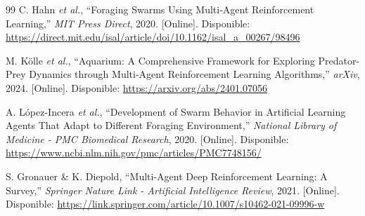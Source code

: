 \documentclass[conference]{IEEEtran}
\begin{document}
\begin{thebibliography}{99}
C. Hahn \textit{et al.}, ``Foraging Swarms Using Multi-Agent Reinforcement Learning,'' \textit{MIT Press Direct}, 2020. [Online]. Disponible: \url{https://direct.mit.edu/isal/article/doi/10.1162/isal_a_00267/98496}

M. Kölle \textit{et al.}, ``Aquarium: A Comprehensive Framework for Exploring Predator-Prey Dynamics through Multi-Agent Reinforcement Learning Algorithms,'' \textit{arXiv}, 2024. [Online]. Disponible: \url{https://arxiv.org/abs/2401.07056}

A. López-Incera \textit{et al.}, ``Development of Swarm Behavior in Artificial Learning Agents That Adapt to Different Foraging Environment,'' \textit{National Library of Medicine - PMC Biomedical Research}, 2020. [Online]. Disponible: \url{https://www.ncbi.nlm.nih.gov/pmc/articles/PMC7748156/}

S. Gronauer \& K. Diepold, ``Multi-Agent Deep Reinforcement Learning: A Survey,'' \textit{Springer Nature Link - Artificial Intelligence Review}, 2021. [Online]. Disponible: \url{https://link.springer.com/article/10.1007/s10462-021-09996-w}

\end{thebibliography}
\end{document}
